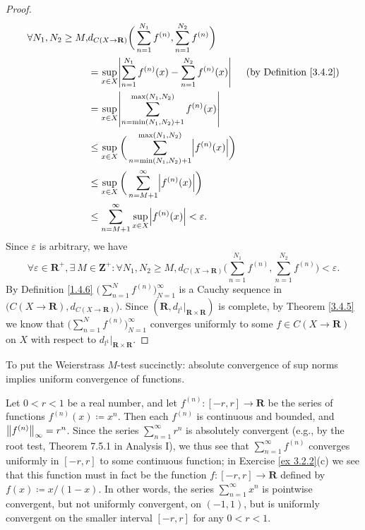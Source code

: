 \begin{proof}
\begin{align*}
        \forall N_1, N_2 \geq M, & d_{C(X \to \mathbf{R})}\bigg(\sum_{n = 1}^{N_1} f^{(n)}, \sum_{n = 1}^{N_2} f^{(n)}\bigg)                                             \\
                                 & = \sup_{x \in X} \abs*{\sum_{n = 1}^{N_1} f^{(n)}(x) - \sum_{n = 1}^{N_2} f^{(n)}(x)}            & \text{(by Definition \ref{3.4.2})} \\
                                 & = \sup_{x \in X} \abs*{\sum_{n = \min(N_1, N_2) + 1}^{\max(N_1, N_2)} f^{(n)}(x)}                                                     \\
                                 & \leq \sup_{x \in X} \bigg(\sum_{n = \min(N_1, N_2) + 1}^{\max(N_1, N_2)} \abs*{f^{(n)}(x)}\bigg)                                      \\
                                 & \leq \sup_{x \in X} \bigg(\sum_{n = M + 1}^\infty \abs*{f^{(n)}(x)}\bigg)                                                             \\
                                 & \leq \sum_{n = M + 1}^\infty \sup_{x \in X} \abs*{f^{(n)}(x)} < \varepsilon.
    \end{align*}
    Since \(\varepsilon\) is arbitrary, we have
    \[
        \forall \varepsilon \in \mathbf{R}^+, \exists\ M \in \mathbf{Z}^+ : \forall N_1, N_2 \geq M, d_{C(X \to \mathbf{R})}\bigg(\sum_{n = 1}^{N_1} f^{(n)}, \sum_{n = 1}^{N_2} f^{(n)}\bigg) < \varepsilon.
    \]
    By Definition \ref{1.4.6} \(\bigg(\sum_{n = 1}^N f^{(n)}\bigg)_{N = 1}^\infty\) is a Cauchy sequence in \(\big(C(X \to \mathbf{R}), d_{C(X \to \mathbf{R})}\big)\).
    Since \((\mathbf{R}, d_{l^1}|_{\mathbf{R} \times \mathbf{R}})\) is complete, by Theorem \ref{3.4.5} we know that \(\bigg(\sum_{n = 1}^N f^{(n)}\bigg)_{N = 1}^\infty\) converges uniformly to some \(f \in C(X \to \mathbf{R})\) on \(X\) with respect to \(d_{l^1}|_{\mathbf{R} \times \mathbf{R}}\).
\end{proof}

\begin{note}
    To put the Weierstrass \(M\)-test succinctly:
    absolute convergence of sup norms implies uniform convergence of functions.
\end{note}

\begin{example}\label{3.5.8}
    Let \(0 < r < 1\) be a real number, and let \(f^{(n)} : [-r, r] \to \mathbf{R}\) be the series of functions \(f^{(n)}(x) \coloneqq x^n\).
    Then each \(f^{(n)}\) is continuous and bounded, and \(\norm*{f^{(n)}}_\infty = r^n\).
    Since the series \(\sum_{n = 1}^\infty r^n\) is absolutely convergent (e.g., by the root test, Theorem 7.5.1 in Analysis I), we thus see that \(\sum_{n = 1}^\infty f^{(n)}\) converges uniformly in \([-r, r]\) to some continuous function;
    in Exercise \ref{ex 3.2.2}(c) we see that this function must in fact be the function \(f : [-r, r] \to \mathbf{R}\) defined by \(f(x) \coloneqq x / (1 - x)\).
    In other words, the series \(\sum_{n = 1}^\infty x^n\) is pointwise convergent, but not uniformly convergent, on \((-1, 1)\), but is uniformly convergent on the smaller interval \([-r, r]\) for any \(0 < r < 1\).
\end{example}

